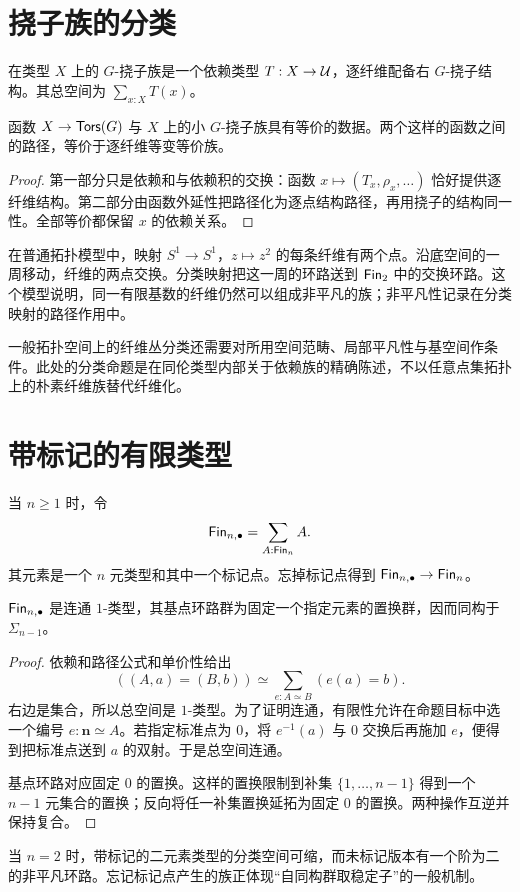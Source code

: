 \section{挠子族的分类}
\begin{definition}[参数化挠子]
在类型 $X$ 上的 $G$-挠子族是一个依赖类型 $T:X\to\mathcal U$，逐纤维配备右 $G$-挠子结构。其总空间为 $\sum_{x:X}T(x)$。
\end{definition}
\begin{proposition}
函数 $X\to\mathsf{Tors}(G)$ 与 $X$ 上的小 $G$-挠子族具有等价的数据。两个这样的函数之间的路径，等价于逐纤维等变等价族。
\end{proposition}
\begin{proof}
第一部分只是依赖和与依赖积的交换：函数 $x\mapsto(T_x,\rho_x,\ldots)$ 恰好提供逐纤维结构。第二部分由函数外延性把路径化为逐点结构路径，再用挠子的结构同一性。全部等价都保留 $x$ 的依赖关系。
\end{proof}
\begin{example}[双覆盖的单值变换]
在普通拓扑模型中，映射 $S^1\to S^1$，$z\mapsto z^2$ 的每条纤维有两个点。沿底空间的一周移动，纤维的两点交换。分类映射把这一周的环路送到 $\mathsf{Fin}_2$ 中的交换环路。这个模型说明，同一有限基数的纤维仍然可以组成非平凡的族；非平凡性记录在分类映射的路径作用中。
\end{example}
\begin{remark}
一般拓扑空间上的纤维丛分类还需要对所用空间范畴、局部平凡性与基空间作条件。此处的分类命题是在同伦类型内部关于依赖族的精确陈述，不以任意点集拓扑上的朴素纤维族替代纤维化。
\end{remark}

\section{带标记的有限类型}
\begin{definition}
当 $n\ge1$ 时，令
\[
\mathsf{Fin}_{n,\bullet}=\sum_{A:\mathsf{Fin}_n}A.
\]
其元素是一个 $n$ 元类型和其中一个标记点。忘掉标记点得到 $\mathsf{Fin}_{n,\bullet}\to\mathsf{Fin}_n$。
\end{definition}
\begin{proposition}
$\mathsf{Fin}_{n,\bullet}$ 是连通 $1$-类型，其基点环路群为固定一个指定元素的置换群，因而同构于 $\Sigma_{n-1}$。
\end{proposition}
\begin{proof}
依赖和路径公式和单价性给出
\[
((A,a)=(B,b))\simeq\sum_{e:A\simeq B}(e(a)=b).
\]
右边是集合，所以总空间是 $1$-类型。为了证明连通，有限性允许在命题目标中选一个编号 $e:\mathbf n\simeq A$。若指定标准点为 $0$，将 $e^{-1}(a)$ 与 $0$ 交换后再施加 $e$，便得到把标准点送到 $a$ 的双射。于是总空间连通。

基点环路对应固定 $0$ 的置换。这样的置换限制到补集 $\{1,\ldots,n-1\}$ 得到一个 $n-1$ 元集合的置换；反向将任一补集置换延拓为固定 $0$ 的置换。两种操作互逆并保持复合。
\end{proof}
\begin{example}
当 $n=2$ 时，带标记的二元素类型的分类空间可缩，而未标记版本有一个阶为二的非平凡环路。忘记标记点产生的族正体现“自同构群取稳定子”的一般机制。
\end{example}
